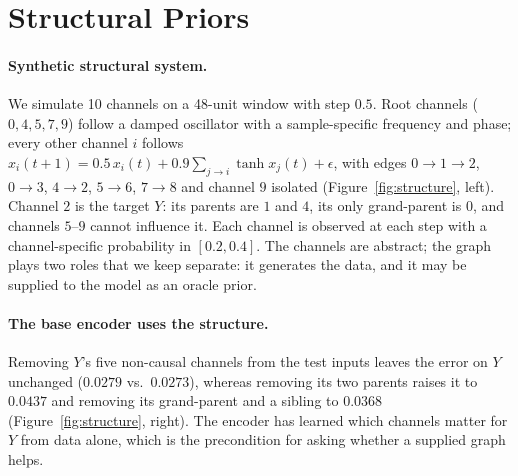 \documentclass[sigconf,nonacm]{acmart}
\begin{document}
\section{Structural Priors}
\label{sec:structure}
\paragraph{Synthetic structural system.}
We simulate 10 channels on a 48-unit window with step $0.5$. Root channels ($0,4,5,7,9$) follow a damped
oscillator with a sample-specific frequency and phase; every other channel $i$ follows
$x_i(t+1)=0.5\,x_i(t)+0.9\sum_{j\to i}\tanh x_j(t)+\epsilon$, with edges $0\to1\to2$, $0\to3$, $4\to2$, $5\to6$,
$7\to8$ and channel $9$ isolated (Figure~\ref{fig:structure}, left). Channel $2$ is the target $Y$: its parents are
$1$ and $4$, its only grand-parent is $0$, and channels $5$--$9$ cannot influence it. Each channel is observed at
each step with a channel-specific probability in $[0.2,0.4]$. The channels are abstract; the graph plays two
roles that we keep separate: it generates the data, and it may be supplied to the model as an oracle prior.

\paragraph{The base encoder uses the structure.}
Removing $Y$'s five non-causal channels from the test inputs leaves the error on $Y$ unchanged ($0.0279$ vs.\
$0.0273$), whereas removing its two parents raises it to $0.0437$ and removing its grand-parent and a sibling to
$0.0368$ (Figure~\ref{fig:structure}, right). The encoder has learned which channels matter for $Y$ from data
alone, which is the precondition for asking whether a supplied graph helps.
\end{document}
